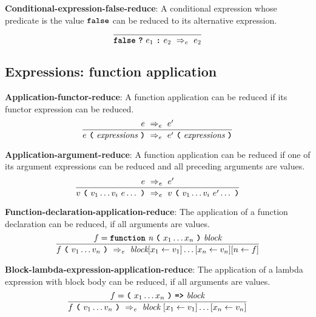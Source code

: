 \vspace{10mm}
\textbf{Conditional-expression-false-reduce}: A conditional
expression whose predicate is the value
$\textbf{\texttt{false}}$
can be reduced to its alternative expression.
\[
\frac{
}{
  \textbf{\texttt{false}}\  \textbf{\texttt{?}}\ e_1\ \textbf{\texttt{:}}\ e_2
  \ \Rightarrow_e \ 
  e_2
}
\]


\subsection*{Expressions: function application}

\textbf{Application-functor-reduce}: A function application
can be reduced if its functor expression can be reduced.
\[
\frac{
  e \ \Rightarrow_e \ e'
}{
  e\  \textbf{\texttt{(}}\ \textit{expressions} \ \textbf{\texttt{)}}
  \ \Rightarrow_e \ 
  e'\  \textbf{\texttt{(}}\ \textit{expressions} \ \textbf{\texttt{)}}
}
\]


\vspace{10mm}
\textbf{Application-argument-reduce}: A function application
can be reduced if one of its argument expressions can be reduced and all
preceding arguments are values.
\[
\frac{
  e \ \Rightarrow_e \ e'
}{
  v\  \textbf{\texttt{(}}\ v_1 \ldots v_i \ e \ldots\ \textbf{\texttt{)}}
  \ \Rightarrow_e \ 
  v\  \textbf{\texttt{(}}\ v_1 \ldots v_i \ e' \ldots\ \textbf{\texttt{)}}
}
\]



\vspace{10mm}
\textbf{Function-declaration-application-reduce}:
The application of a function declaration
can be reduced, if all
arguments are values. 
\[
\frac{
  f = \textbf{\texttt{function}}\  \textit{n} \ 
                 \textbf{\texttt{(}}\  x_1 \ldots x_n
                 \ \textbf{\texttt{)}}\ \textit{block}
}{
  f\ \textbf{\texttt{(}}\ v_1 \ldots v_n\ \textbf{\texttt{)}}
  \ \Rightarrow_e \ 
  \textit{block} [x_1 \leftarrow v_1]\ldots[x_n \leftarrow v_n]
  [n \leftarrow f]
}
\]

\vspace{10mm}
\textbf{Block-lambda-expression-application-reduce}:
The application of a lambda expression with block body
can be reduced, if all
arguments are values. 
\[
\frac{
  f = \textbf{\texttt{(}}\  x_1 \ldots x_n
                 \ \textbf{\texttt{)}}\ \textbf{\texttt{=>}}\ \textit{block}
}{
  f\ \textbf{\texttt{(}}\ v_1 \ldots v_n\ \textbf{\texttt{)}}
  \ \Rightarrow_e \ 
  \textit{block}\ [x_1 \leftarrow v_1]\ldots[x_n \leftarrow v_n]
}
\]


